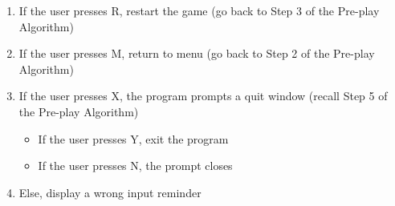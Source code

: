 \begin{enumerate}
        \begin{enumerate}[label=\alph*]
            \item If the user presses R, restart the game (go back to Step 3 of the Pre-play Algorithm)
            \item If the user presses M, return to menu (go back to Step 2 of the Pre-play Algorithm)
            \item If the user presses X, the program prompts a quit window (recall Step 5 of the Pre-play Algorithm)
                \begin{itemize}[label={}]
                    \item If the user presses Y, exit the program
                    \item If the user presses N, the prompt closes
                \end{itemize}
            \item Else, display a wrong input reminder
        \end{enumerate}
\end{enumerate}